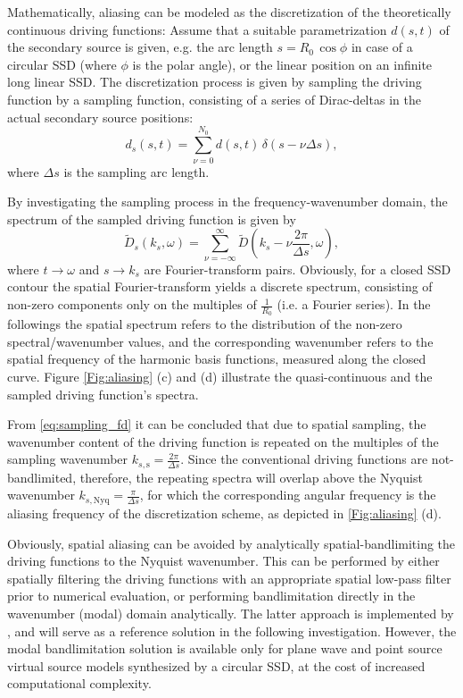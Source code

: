 \documentclass[conference]{IEEEtran}
\begin{document}
Mathematically, aliasing can be modeled as the discretization of the theoretically continuous driving functions:
Assume that a suitable parametrization $d(s,t)$ of the secondary source is given, e.g. the arc length $s = R_0\, \cos \phi$ in case of a circular SSD (where $\phi$ is the polar angle), or the linear position on an infinite long linear SSD.
The discretization process is given by sampling the driving function by a sampling function, consisting of a series of Dirac-deltas in the actual secondary source positions:
\begin{equation}
    d_s(s,t) = \sum_{\nu = 0}^{N_0} d(s,t) \, \delta(s - \nu \Delta s),
    \label{eq:sampling_td}
\end{equation}
where $\Delta s$ is the sampling arc length.

By investigating the sampling process in the frequency-wavenumber domain, the spectrum of the sampled driving function is given by
\begin{equation}
    \tilde{D}_s(k_s,\omega) = \sum_{\nu = -\infty}^{\infty} \tilde{D}\left(k_s- \nu \frac{2\pi}{\Delta s},\omega\right),
    \label{eq:sampling_fd}
\end{equation}
where $t \rightarrow \omega$ and $s \rightarrow k_s$ are Fourier-transform pairs.
Obviously, for a closed SSD contour the spatial Fourier-transform yields a discrete spectrum, consisting of non-zero components only on the multiples of $\frac{1}{R_0}$ (i.e. a Fourier series).
In the followings the spatial spectrum refers to the distribution of the non-zero spectral/wavenumber values, and the corresponding wavenumber refers to the spatial frequency of the harmonic basis functions, measured along the closed curve.
Figure \ref{Fig:aliasing} (c) and (d) illustrate the quasi-continuous and the sampled driving function's spectra.

From \eqref{eq:sampling_fd} it can be concluded that due to spatial sampling, the wavenumber content of the driving function is repeated on the multiples of the sampling wavenumber $k_{s, \mathrm{s}} = \frac{2\pi}{\Delta s}$.
Since the conventional driving functions are not-bandlimited, therefore, the repeating spectra will overlap above the Nyquist wavenumber $k_{s, \mathrm{Nyq}} = \frac{\pi}{\Delta s}$, for which the corresponding angular frequency is the aliasing frequency of the discretization scheme, as depicted in \ref{Fig:aliasing} (d).

Obviously, spatial aliasing can be avoided by analytically spatial-bandlimiting the driving functions to the Nyquist wavenumber.
This can be performed by either spatially filtering the driving functions with an appropriate spatial low-pass filter prior to numerical evaluation, or performing bandlimitation directly in the wavenumber (modal) domain analytically.
The latter approach is implemented by \cite{Nara and Fiete}, and will serve as a reference solution in the following investigation.
However, the modal bandlimitation solution is available only for plane wave and point source virtual source models synthesized by a circular SSD, at the cost of increased computational complexity.
\end{document}
